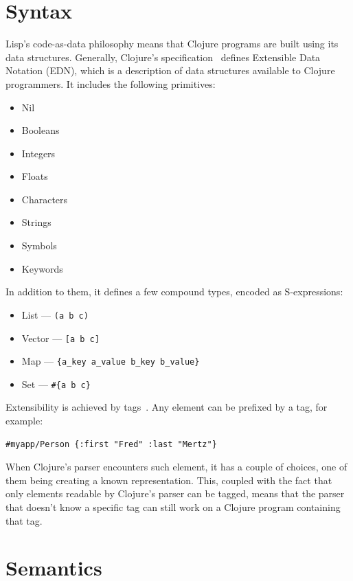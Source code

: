 \documentclass[english,mgr,shortabstract]{iithesis}
\begin{document}
\section{Syntax}
Lisp’s code-as-data philosophy means that Clojure programs are built using its
data structures.
Generally, Clojure’s specification~\cite{clojure_spec} defines Extensible Data Notation
(EDN), which is a description of data structures available to Clojure
programmers.
It includes the following primitives:
\begin{itemize}
  \item Nil
  \item Booleans
  \item Integers
  \item Floats
  \item Characters
  \item Strings
  \item Symbols
  \item Keywords
\end{itemize}
In addition to them, it defines a few compound types, encoded as S-expressions:
\begin{itemize}
  \item List --- \lstinline$(a b c) $
  \item Vector --- \lstinline$[a b c]$
  \item Map --- \lstinline|{a_key a_value b_key b_value}|
  \item Set --- \lstinline$#{a b c}$
\end{itemize}
Extensibility is achieved by tags~\cite{edn_format}. Any element can be
prefixed by a tag, for example:
\begin{lstlisting}
#myapp/Person {:first "Fred" :last "Mertz"} 
\end{lstlisting}
When Clojure’s parser encounters such element, it has a couple of choices, one
of them being creating a known representation.
This, coupled with the fact that only elements readable by Clojure’s parser can
be tagged, means that the parser that doesn’t know a specific tag can still work
on a Clojure program containing that tag.


\section{Semantics}
\end{document}
